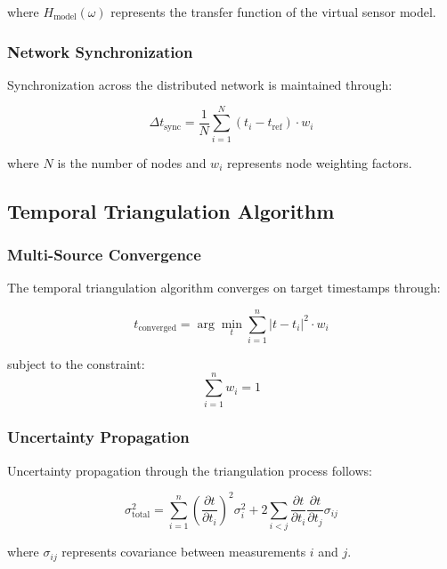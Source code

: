 \documentclass[12pt,a4paper]{article}
\begin{document}
{where $H_{\text{model}}(\omega)$ represents the transfer function of the virtual sensor model.

\subsubsection{Network Synchronization}

Synchronization across the distributed network is maintained through:

\begin{equation}
\Delta t_{\text{sync}} = \frac{1}{N} \sum_{i=1}^{N} (t_i - t_{\text{ref}}) \cdot w_i
\end{equation}

where $N$ is the number of nodes and $w_i$ represents node weighting factors.

\subsection{Temporal Triangulation Algorithm}

\subsubsection{Multi-Source Convergence}

The temporal triangulation algorithm converges on target timestamps through:

\begin{equation}
t_{\text{converged}} = \arg\min_t \sum_{i=1}^{n} |t - t_i|^2 \cdot w_i
\end{equation}

subject to the constraint:
\begin{equation}
\sum_{i=1}^{n} w_i = 1
\end{equation}

\subsubsection{Uncertainty Propagation}

Uncertainty propagation through the triangulation process follows:

\begin{equation}
\sigma_{\text{total}}^2 = \sum_{i=1}^{n} \left(\frac{\partial t}{\partial t_i}\right)^2 \sigma_i^2 + 2\sum_{i<j} \frac{\partial t}{\partial t_i} \frac{\partial t}{\partial t_j} \sigma_{ij}
\end{equation}

where $\sigma_{ij}$ represents covariance between measurements $i$ and $j$.

}
\end{document}
